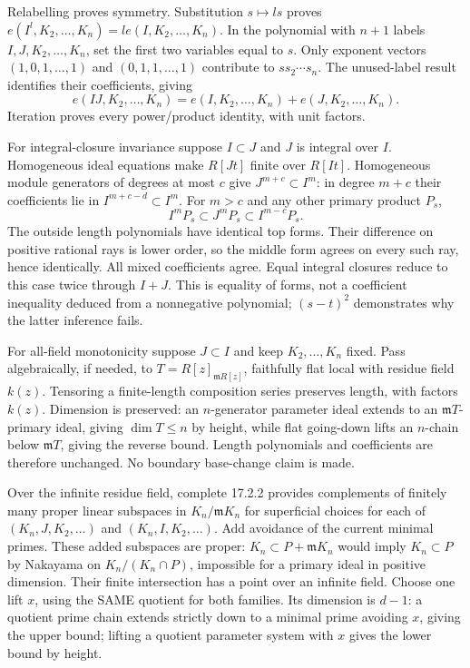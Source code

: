 Relabelling proves symmetry. Substitution \(s\mapsto ls\) proves \(e(I^l,K_2,\ldots,K_n)=l e(I,K_2,\ldots,K_n)\). In the polynomial with \(n+1\) labels \(I,J,K_2,\ldots,K_n\), set the first two variables equal to \(s\). Only exponent vectors \((1,0,1,\ldots,1)\) and \((0,1,1,\ldots,1)\) contribute to \(s s_2\cdots s_n\). The unused-label result identifies their coefficients, giving
\[
e(IJ,K_2,\ldots,K_n)=e(I,K_2,\ldots,K_n)+e(J,K_2,\ldots,K_n).
\]
Iteration proves every power/product identity, with unit factors.

For integral-closure invariance suppose \(I\subset J\) and \(J\) is integral over \(I\). Homogeneous ideal equations make \(R[Jt]\) finite over \(R[It]\). Homogeneous module generators of degrees at most \(c\) give \(J^{m+c}\subset I^m\): in degree \(m+c\) their coefficients lie in \(I^{m+c-d}\subset I^m\). For \(m>c\) and any other primary product \(P_s\),
\[
I^mP_s\subset J^mP_s\subset I^{m-c}P_s.
\]
The outside length polynomials have identical top forms. Their difference on positive rational rays is lower order, so the middle form agrees on every such ray, hence identically. All mixed coefficients agree. Equal integral closures reduce to this case twice through \(I+J\). This is equality of forms, not a coefficient inequality deduced from a nonnegative polynomial; \((s-t)^2\) demonstrates why the latter inference fails.

For all-field monotonicity suppose \(J\subset I\) and keep \(K_2,\ldots,K_n\) fixed. Pass algebraically, if needed, to \(T=R[z]_{\mathfrak mR[z]}\), faithfully flat local with residue field \(k(z)\). Tensoring a finite-length composition series preserves length, with factors \(k(z)\). Dimension is preserved: an \(n\)-generator parameter ideal extends to an \(\mathfrak mT\)-primary ideal, giving \(\dim T\le n\) by height, while flat going-down lifts an \(n\)-chain below \(\mathfrak mT\), giving the reverse bound. Length polynomials and coefficients are therefore unchanged. No boundary base-change claim is made.

Over the infinite residue field, complete 17.2.2 provides complements of finitely many proper linear subspaces in \(K_n/\mathfrak mK_n\) for superficial choices for each of \((K_n,J,K_2,\ldots)\) and \((K_n,I,K_2,\ldots)\). Add avoidance of the current minimal primes. These added subspaces are proper: \(K_n\subset P+\mathfrak mK_n\) would imply \(K_n\subset P\) by Nakayama on \(K_n/(K_n\cap P)\), impossible for a primary ideal in positive dimension. Their finite intersection has a point over an infinite field. Choose one lift \(x\), using the SAME quotient for both families. Its dimension is \(d-1\): a quotient prime chain extends strictly down to a minimal prime avoiding \(x\), giving the upper bound; lifting a quotient parameter system with \(x\) gives the lower bound by height.

